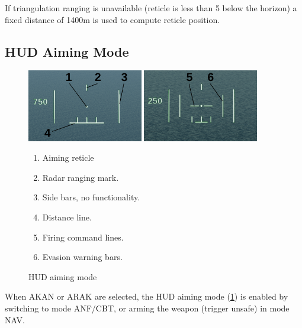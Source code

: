 If triangulation ranging is unavailable (reticle is less than 5\textdegree{} below the horizon)
a fixed distance of 1400m is used to compute reticle position.

\subsection{HUD Aiming Mode}
\begin{figure}[!ht]
  \centering
  \includegraphics[width=0.45\textwidth]{images/displays/ajs-hud-aiming1.png}
  \includegraphics[width=0.45\textwidth]{images/displays/ajs-hud-aiming2.png}

  \begin{multicols}{2}
    \begin{enumerate}[nosep]
      \item \label{item:reticle} Aiming reticle
      \item \label{item:rdr-range} Radar ranging mark.
      \item Side bars, no functionality.
      \item \label{item:distline} Distance line.
      \item \label{item:fire-mark} Firing command lines.
      \item \label{item:pullup-bars} Evasion warning bars.
    \end{enumerate}
  \end{multicols}
  \caption{HUD aiming mode}
  \label{fig:hud-aiming}
\end{figure}

When AKAN or ARAK are selected, the HUD aiming mode (\cref{fig:hud-aiming})
is enabled by switching to mode ANF/CBT, or arming the weapon (trigger unsafe) in mode NAV.

